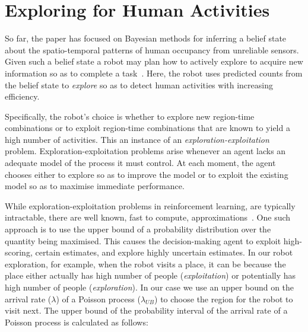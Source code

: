 
\section{Exploring for Human Activities}
\label{sec:exploration}

So far, the paper has focused on Bayesian methods for inferring a belief state about the spatio-temporal patterns of human occupancy from unreliable sensors. Given such a belief state a robot may plan how to actively explore to acquire new information so as to complete a task~\cite{hanheide2017robot, sridharan2019reba}. Here, the robot uses predicted counts from the belief state to \emph{explore} so as to detect human activities with increasing efficiency. 

Specifically, the robot's choice is whether to explore new region-time combinations or to exploit region-time combinations that are known to yield a high number of activities. This an instance of an \emph{exploration-exploitation} problem. Exploration-exploitation problems arise whenever an agent lacks an adequate model of the process it must control. At each moment, the agent chooses either to explore so as to improve the model or to exploit the existing model so as to maximise immediate performance. 

While exploration-exploitation problems in reinforcement learning, are typically intractable, there are well known, fast to compute, approximations~\cite{wyatt1998exploration, 1413255, AUDIBERT20091876}. One such approach is to use the upper bound of a probability distribution over the quantity being maximised. This causes the decision-making agent to exploit high-scoring, certain estimates, and explore highly uncertain estimates. In our robot exploration, for example, when the robot visits a place, it can be because the place either actually has high number of people (\textit{exploitation}) or potentially has high number of people (\textit{exploration}). In our case we use an upper bound on the arrival rate ($\lambda$) of a Poisson process ($\lambda_{UB}$) to choose the region for the robot to visit next. The upper bound of the probability interval of the arrival rate of a Poisson process is calculated as follows:

